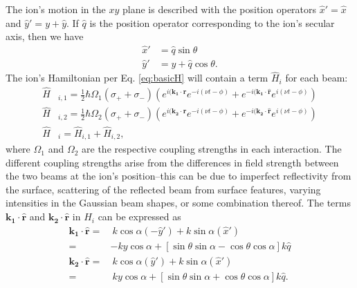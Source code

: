 The ion's motion in the $xy$ plane is described with the position operators $\hat{x}' = \hat{x}$ and $\hat{y}' = y + \hat{y}$. If $\hat{q}$ is the position operator corresponding to the ion's secular axis, then we have
\begin{equation}
\begin{split}
\hat{x}' &= \hat{q} \sin \theta \\
\hat{y}' &= y + \hat{q} \cos \theta \text{.}
\end{split}
\end{equation}
The ion's Hamiltonian per Eq. \ref{eq:basicH} will contain a term $\hat{H}_i$ for each beam:
\begin{equation}
\begin{split}
\hat{H}&_{i,1} = \frac{1}{2} \hbar \Omega_1 (\sigma_+ + \sigma_-) ( e^{i (\mathbf{k_1} \cdot \mathbf{\hat{r}} } e^{-i (\nu t - \phi)} + e^{-i (\mathbf{k_1} \cdot \mathbf{\hat{r}} } e^{i (\nu t - \phi)} ) \\
\hat{H}&_{i,2} = \frac{1}{2} \hbar \Omega_2 (\sigma_+ + \sigma_-) ( e^{i (\mathbf{k_2} \cdot \mathbf{\hat{r}} } e^{-i (\nu t - \phi)} + e^{-i (\mathbf{k_2} \cdot \mathbf{\hat{r}} } e^{i (\nu t - \phi)} ) \\
\hat{H}&_i = \hat{H}_{i,1} + \hat{H}_{i,2}  \text{,}
\end{split}
\label{eq:His}
\end{equation}  
where $\Omega_1$ and $\Omega_2$ are the respective coupling strengths in each interaction. The different coupling strengths arise from the differences in field strength between the two beams at the ion's position--this can be due to imperfect reflectivity from the surface, scattering of the reflected beam from surface features, varying intensities in the Gaussian beam shapes, or some combination thereof. The terms $\mathbf{k_1} \cdot \mathbf{\hat{r}}$ and $\mathbf{k_2} \cdot \mathbf{\hat{r}}$ in $H_i$ can be expressed as 
\begin{equation}
\begin{split}
\mathbf{k_1} \cdot \mathbf{\hat{r}} =& \ k \cos \alpha (-\hat{y}') + k \sin \alpha (\hat{x}') \\
=& -k y \cos \alpha + [ \sin \theta \sin \alpha - \cos \theta \cos \alpha ] k \hat{q} \\
\mathbf{k_2} \cdot \mathbf{\hat{r}} =& \ k \cos \alpha (\hat{y}') + k \sin \alpha (\hat{x}') \\
=& \ k y \cos \alpha + [ \sin \theta \sin \alpha + \cos \theta \cos \alpha ] k \hat{q} \text{.}
\end{split}
\label{eq:kdotr}
\end{equation}


